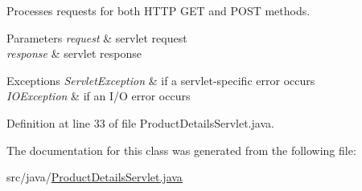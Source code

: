 Processes requests for both H\+T\+TP {\ttfamily G\+ET} and {\ttfamily P\+O\+ST} methods.


\begin{DoxyParams}{Parameters}
{\em request} & servlet request \\
\hline
{\em response} & servlet response \\
\hline
\end{DoxyParams}

\begin{DoxyExceptions}{Exceptions}
{\em Servlet\+Exception} & if a servlet-\/specific error occurs \\
\hline
{\em I\+O\+Exception} & if an I/O error occurs \\
\hline
\end{DoxyExceptions}


Definition at line 33 of file Product\+Details\+Servlet.\+java.



The documentation for this class was generated from the following file\+:\begin{DoxyCompactItemize}
\item 
src/java/\mbox{\hyperlink{_product_details_servlet_8java}{Product\+Details\+Servlet.\+java}}\end{DoxyCompactItemize}

